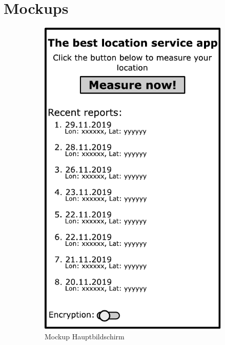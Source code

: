 \section{Mockups}

\begin{figure}[H]
	\centering
	\begin{subfigure}{.4\textwidth}
		\centering
		\includegraphics[width=.8\textwidth]{graphics/mockupmainfragment}
		\caption{Mockup Hauptbildschirm}
		\label{fig:mockHaupt}
	\end{subfigure}
	\begin{subfigure}{.4\textwidth}
		\centering

\end{subfigure}
\end{figure}
